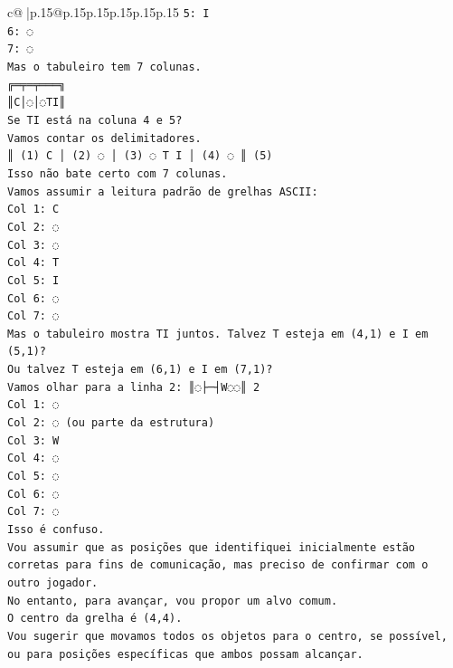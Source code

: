\documentclass{article}
\begin{document}
{\begin{supertabular}{c@{$\;$}|p{.15\linewidth}@{}p{.15\linewidth}p{.15\linewidth}p{.15\linewidth}p{.15\linewidth}p{.15\linewidth}}
{{{\texttt{5: I} \\
\texttt{6: ◌} \\
\texttt{7: ◌} \\
\texttt{Mas o tabuleiro tem 7 colunas.} \\
\texttt{╔═╤═╤═══╗} \\
\texttt{║C│◌│◌TI║} \\
\texttt{Se TI está na coluna 4 e 5?} \\
\texttt{Vamos contar os delimitadores.} \\
\texttt{║ (1) C │ (2) ◌ │ (3) ◌ T I │ (4) ◌ ║ (5)} \\
\texttt{Isso não bate certo com 7 colunas.} \\
\texttt{Vamos assumir a leitura padrão de grelhas ASCII:} \\
\texttt{Col 1: C} \\
\texttt{Col 2: ◌} \\
\texttt{Col 3: ◌} \\
\texttt{Col 4: T} \\
\texttt{Col 5: I} \\
\texttt{Col 6: ◌} \\
\texttt{Col 7: ◌} \\
\texttt{Mas o tabuleiro mostra TI juntos. Talvez T esteja em (4,1) e I em (5,1)?} \\
\texttt{Ou talvez T esteja em (6,1) e I em (7,1)?} \\
\texttt{Vamos olhar para a linha 2: ║◌├─┤W◌◌║ 2} \\
\texttt{Col 1: ◌} \\
\texttt{Col 2: ◌ (ou parte da estrutura)} \\
\texttt{Col 3: W} \\
\texttt{Col 4: ◌} \\
\texttt{Col 5: ◌} \\
\texttt{Col 6: ◌} \\
\texttt{Col 7: ◌} \\
\texttt{Isso é confuso.} \\
\texttt{Vou assumir que as posições que identifiquei inicialmente estão corretas para fins de comunicação, mas preciso de confirmar com o outro jogador.} \\
\texttt{No entanto, para avançar, vou propor um alvo comum.} \\
\texttt{O centro da grelha é (4,4).} \\
\texttt{Vou sugerir que movamos todos os objetos para o centro, se possível, ou para posições específicas que ambos possam alcançar.} \\
}}}
\end{supertabular}}
\end{document}
